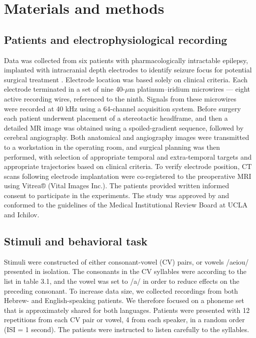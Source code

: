 \section{Materials and methods}
\subsection{Patients and electrophysiological recording}
Data was collected from six patients with pharmacologically intractable epilepsy, implanted with intracranial depth electrodes to identify seizure focus for potential surgical treatment \citep{mukamel2012human}. Electrode location was based solely on clinical criteria. Each electrode terminated in a set of nine 40-$\mu$m platinum–iridium microwires \citep{fried1999cerebral} — eight active recording wires, referenced to the ninth. Signals from these microwires were recorded at 40 kHz using a 64-channel acquisition system. Before surgery each patient underwent placement of a stereotactic headframe, and then a detailed MR image was obtained using a spoiled-gradient sequence, followed by cerebral angiography. Both anatomical and angiography images were transmitted to a workstation in the operating room, and surgical planning was then performed, with selection of appropriate temporal and extra-temporal targets and appropriate trajectories based on clinical criteria. To verify electrode position, CT scans following electrode implantation were co-registered to the preoperative MRI using Vitrea® (Vital Images Inc.). The patients provided written informed consent to participate in the experiments. The study was approved by and conformed to the guidelines of the Medical Institutional Review Board at UCLA and Ichilov.

\subsection{Stimuli and behavioral task}
Stimuli were constructed of either consonant-vowel (CV) pairs, or vowels /aeiou/ presented in isolation. The consonants in the CV syllables were according to the list in table 3.1, and the vowel was set to /a/ in order to reduce effects on the preceding consonant. To increase data size, we collected recordings from both Hebrew- and English-speaking patients. We therefore focused on a phoneme set that is approximately shared for both languages. Patients  were presented with 12 repetitions from each CV pair or vowel, 4 from each speaker, in a random order (ISI = 1 second). The patients were instructed to listen carefully to the syllables.


